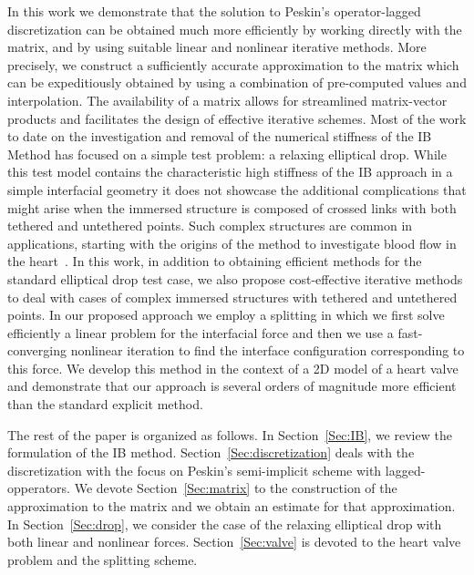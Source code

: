 \documentclass[preprint,12pt]{elsarticle}
\begin{document}
In this work  we demonstrate that the solution to Peskin's operator-lagged discretization
can be obtained much more efficiently by working directly with the matrix, and by using suitable linear and nonlinear iterative methods. More precisely, we construct a sufficiently accurate approximation to the matrix which can
be expeditiously obtained by using a combination of pre-computed values and interpolation.   The availability  of a matrix allows 
for streamlined matrix-vector products and facilitates the design of effective iterative schemes.   Most of the work to date on the investigation and removal of the numerical stiffness of the IB Method has focused on a simple test problem: a relaxing elliptical drop.
While this test model contains the characteristic high stiffness of the IB approach in a simple interfacial geometry it does not showcase the additional complications that might arise when the immersed structure is composed of crossed links with both tethered and untethered points. Such complex structures are common in applications, starting with the origins of the method to investigate blood
flow in the heart~\cite{Peskin77}.  In this work, in addition to obtaining efficient methods for 
the standard elliptical drop test case, we also propose cost-effective iterative methods to deal with cases of complex immersed structures with tethered and untethered points. In our proposed approach
we employ  a splitting in which we first solve efficiently a linear problem for the interfacial force and then we use a fast-converging nonlinear iteration to find the interface configuration corresponding to this force.  We develop this method in the context of a 2D
model of a heart valve and demonstrate that our approach is several orders of magnitude more efficient than the standard explicit method. 
 
 The rest of the paper is organized as follows. In Section~\ref{Sec:IB}, we review the formulation of the IB method. Section~\ref{Sec:discretization} deals with the discretization with the focus on  Peskin's semi-implicit scheme with lagged-opperators. We devote Section~\ref{Sec:matrix} to the construction of the approximation to the matrix and we obtain an estimate for that approximation.
 In Section~\ref{Sec:drop}, we consider the case of the relaxing elliptical drop with both linear and nonlinear forces.  Section~\ref{Sec:valve} is devoted to the heart valve problem and the splitting scheme.
\end{document}
